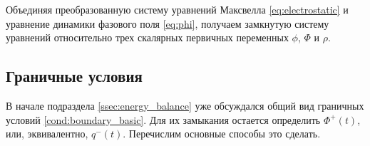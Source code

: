 Объединяя преобразованную систему уравнений Максвелла \eqref{eq:electrostatic} и уравнение динамики фазового поля \eqref{eq:phi}, получаем замкнутую систему уравнений относительно трех скалярных первичных переменных $\phi$, $\Phi$ и $\rho$.





\subsection{Граничные условия}

В начале подраздела \ref{ssec:energy_balance} уже обсуждался общий вид граничных условий \eqref{cond:boundary_basic}. Для их замыкания остается определить $\Phi^+(t)$, или, эквивалентно, $q^-(t)$. Перечислим основные способы это сделать.

